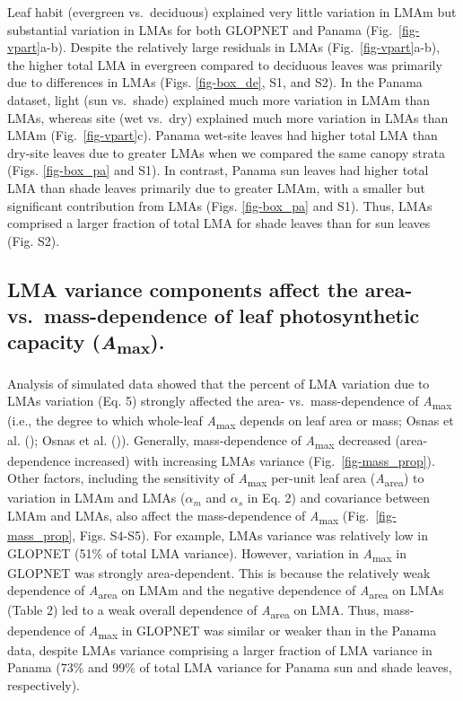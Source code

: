 \documentclass[
  12pt,
  letterpaper,
  DIV=11,
  numbers=noendperiod]{scrartcl}
\begin{document}
Leaf habit (evergreen vs.~deciduous) explained very little variation in
LMAm but substantial variation in LMAs for both GLOPNET and Panama
(Fig.~\ref{fig-vpart}a-b). Despite the relatively large residuals in
LMAs (Fig.~\ref{fig-vpart}a-b), the higher total LMA in evergreen
compared to deciduous leaves was primarily due to differences in LMAs
(Figs. \ref{fig-box_de}, S1, and S2). In the Panama dataset, light (sun
vs.~shade) explained much more variation in LMAm than LMAs, whereas site
(wet vs.~dry) explained much more variation in LMAs than LMAm
(Fig.~\ref{fig-vpart}c). Panama wet-site leaves had higher total LMA
than dry-site leaves due to greater LMAs when we compared the same
canopy strata (Figs. \ref{fig-box_pa} and S1). In contrast, Panama sun
leaves had higher total LMA than shade leaves primarily due to greater
LMAm, with a smaller but significant contribution from LMAs (Figs.
\ref{fig-box_pa} and S1). Thus, LMAs comprised a larger fraction of
total LMA for shade leaves than for sun leaves (Fig. S2).

\subsection{\texorpdfstring{LMA variance components affect the area-
vs.~mass-dependence of leaf photosynthetic capacity
(\emph{A}\textsubscript{max}).}{LMA variance components affect the area- vs.~mass-dependence of leaf photosynthetic capacity (Amax).}}\label{lma-variance-components-affect-the-area--vs.-mass-dependence-of-leaf-photosynthetic-capacity-amax.}

Analysis of simulated data showed that the percent of LMA variation due
to LMAs variation (Eq. 5) strongly affected the area-
vs.~mass-dependence of \emph{A}\textsubscript{max} (i.e., the degree to
which whole-leaf \emph{A}\textsubscript{max} depends on leaf area or
mass; Osnas et al. (); Osnas et al.
()). Generally, mass-dependence of
\emph{A}\textsubscript{max} decreased (area-dependence increased) with
increasing LMAs variance (Fig.~\ref{fig-mass_prop}). Other factors,
including the sensitivity of \emph{A}\textsubscript{max} per-unit leaf
area (\emph{A}\textsubscript{area}) to variation in LMAm and LMAs
(\(\alpha_m\) and \(\alpha_s\) in Eq. 2) and covariance between LMAm and
LMAs, also affect the mass-dependence of \emph{A}\textsubscript{max}
(Fig.~\ref{fig-mass_prop}, Figs. S4-S5). For example, LMAs variance was
relatively low in GLOPNET (51\% of total LMA variance). However,
variation in \emph{A}\textsubscript{max} in GLOPNET was strongly
area-dependent. This is because the relatively weak dependence of
\emph{A}\textsubscript{area} on LMAm and the negative dependence of
\emph{A}\textsubscript{area} on LMAs (Table 2) led to a weak overall
dependence of \emph{A}\textsubscript{area} on LMA. Thus, mass-dependence
of \emph{A}\textsubscript{max} in GLOPNET was similar or weaker than in
the Panama data, despite LMAs variance comprising a larger fraction of
LMA variance in Panama (73\% and 99\% of total LMA variance for Panama
sun and shade leaves, respectively).
\end{document}

